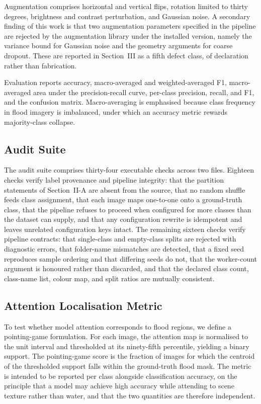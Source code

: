 \documentclass[11pt,journal]{IEEEtran}
\begin{document}
Augmentation comprises horizontal and vertical flips, rotation limited to
thirty degrees, brightness and contrast perturbation, and Gaussian noise. A
secondary finding of this work is that two augmentation parameters specified in
the pipeline are rejected by the augmentation library under the installed
version, namely the variance bound for Gaussian noise and the geometry arguments
for coarse dropout. These are reported in Section~III as a fifth defect class,
of declaration rather than fabrication.

Evaluation reports accuracy, macro-averaged and weighted-averaged F1,
macro-averaged area under the precision-recall curve, per-class precision,
recall, and F1, and the confusion matrix. Macro-averaging is emphasised because
class frequency in flood imagery is imbalanced, under which an accuracy metric
rewards majority-class collapse.

\subsection{Audit Suite}

The audit suite comprises thirty-four executable checks across two files.
Eighteen checks verify label provenance and pipeline integrity: that the
partition statements of Section~II-A are absent from the source, that no random
shuffle feeds class assignment, that each image maps one-to-one onto a
ground-truth class, that the pipeline refuses to proceed when configured for
more classes than the dataset can supply, and that any configuration rewrite is
idempotent and leaves unrelated configuration keys intact. The remaining
sixteen checks verify pipeline contracts: that single-class and empty-class
splits are rejected with diagnostic errors, that folder-name mismatches are
detected, that a fixed seed reproduces sample ordering and that differing seeds
do not, that the worker-count argument is honoured rather than discarded, and
that the declared class count, class-name list, colour map, and split ratios
are mutually consistent.

\subsection{Attention Localisation Metric}

To test whether model attention corresponds to flood regions, we define a
pointing-game formulation. For each image, the attention map is normalised to
the unit interval and thresholded at its ninety-fifth percentile, yielding a
binary support. The pointing-game score is the fraction of images for which the
centroid of the thresholded support falls within the ground-truth flood mask.
The metric is intended to be reported per class alongside classification
accuracy, on the principle that a model may achieve high accuracy while
attending to scene texture rather than water, and that the two quantities are
therefore independent.
\end{document}
